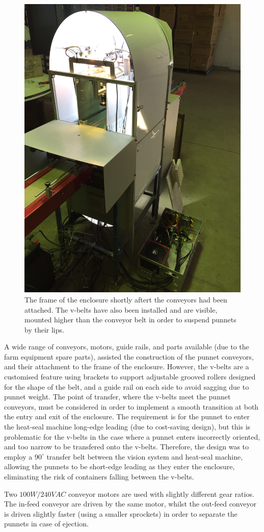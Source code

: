 \documentclass[fleqn,twoside]{article}
\begin{document}
\begin{figure}[h]
	\centering
	\includegraphics[width=.4\linewidth]{system_construct_3.jpg}
	\caption{The frame of the enclosure shortly aftert the conveyors had been attached. The v-belts have also been installed and are visible, mounted higher than the conveyor belt in order to suspend punnets by their lips.}
	\label{fig:system_construct_3}
\end{figure}%


A wide range of conveyors, motors, guide rails, and parts available (due to the farm equipment spare parts), assisted the construction of the punnet conveyors, and their attachment to the frame of the enclosure. However, the v-belts are a customised feature using brackets to support adjustable grooved rollers designed for the shape of the belt, and a guide rail on each side to avoid sagging due to punnet weight. The point of transfer, where the v-belts meet the punnet conveyors, must be considered in order to implement a smooth transition at both the entry and exit of the enclosure. The requirement is for the punnet to enter the heat-seal machine long-edge leading (due to cost-saving design), but this is problematic for the v-belts in the case where a  punnet enters incorrectly oriented, and too narrow to be transfered onto the v-belts. Therefore, the design was to employ a $90^{\circ}$ transfer belt between the vision system and heat-seal machine, allowing the punnets to be short-edge leading as they enter the enclosure, eliminating the risk of containers falling between the v-belts. 


Two $100W/240VAC$ conveyor motors are used with slightly different gear ratios. The in-feed conveyor are driven by the same motor, whilst the out-feed conveyor is driven slightly faster (using a smaller sprockets) in order to separate the punnets in case of ejection.
\end{document}
